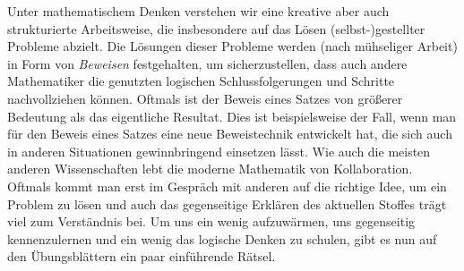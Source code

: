Unter mathematischem Denken verstehen wir eine kreative aber auch strukturierte
Arbeitsweise, die insbesondere auf das Lösen (selbst-)gestellter Probleme
abzielt.
Die Lösungen dieser Probleme werden (nach mühseliger Arbeit) in Form von
\textit{Beweisen} festgehalten, um sicherzustellen, dass auch andere
Mathematiker die genutzten logischen Schlussfolgerungen und Schritte
nachvollziehen können.
Oftmals ist der Beweis eines Satzes von größerer Bedeutung als das eigentliche
Resultat.
Dies ist beispielsweise der Fall, wenn man für den Beweis eines Satzes eine
neue Beweistechnik entwickelt hat, die sich auch in anderen Situationen
gewinnbringend einsetzen lässt.
Wie auch die meisten anderen Wissenschaften lebt die moderne Mathematik von
Kollaboration.
Oftmals kommt man erst im Gespräch mit anderen auf die richtige Idee, um ein
Problem zu lösen und auch das gegenseitige Erklären des aktuellen Stoffes trägt
viel zum Verständnis bei.
\newline
Um uns ein wenig aufzuwärmen, uns gegenseitig kennenzulernen und ein wenig das
logische Denken zu schulen, gibt es nun auf den Übungsblättern ein paar
einführende Rätsel.
